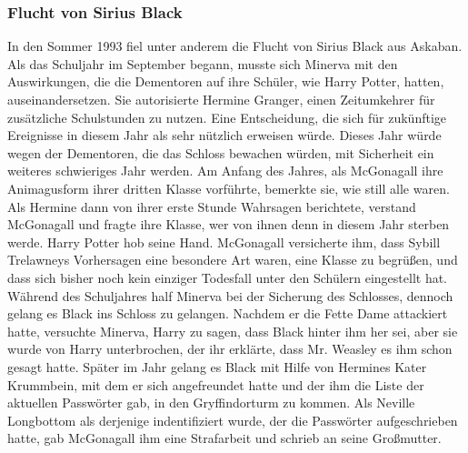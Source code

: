 \documentclass[a4paper, 10pt]{article}
\begin{document}
\subsubsection*{\large Flucht von Sirius Black}
In den Sommer 1993 fiel unter anderem die Flucht von Sirius Black aus Askaban. Als das Schuljahr im September begann, musste sich Minerva mit den Auswirkungen, die die Dementoren auf ihre Schüler, wie Harry Potter, hatten, auseinandersetzen. Sie autorisierte Hermine Granger, einen Zeitumkehrer für zusätzliche Schulstunden zu nutzen. Eine Entscheidung, die sich für zukünftige Ereignisse in diesem Jahr als sehr nützlich erweisen würde. Dieses Jahr würde wegen der Dementoren, die das Schloss bewachen würden, mit Sicherheit ein weiteres schwieriges Jahr werden.
\vspace{10pt}
\newline
{}  
Am Anfang des Jahres, als McGonagall ihre Animagusform ihrer dritten Klasse vorführte, bemerkte sie, wie still alle waren. Als Hermine dann von ihrer erste Stunde Wahrsagen berichtete, verstand McGonagall und fragte ihre Klasse, wer von ihnen denn in diesem Jahr sterben werde. Harry Potter hob seine Hand. McGonagall versicherte ihm, dass Sybill Trelawneys Vorhersagen eine besondere Art waren, eine Klasse zu begrüßen, und dass sich bisher noch kein einziger Todesfall unter den Schülern eingestellt hat.
\vspace{10pt}
\newline
{}  
Während des Schuljahres half Minerva bei der Sicherung des Schlosses, dennoch gelang es Black ins Schloss zu gelangen. Nachdem er die Fette Dame attackiert hatte, versuchte Minerva, Harry zu sagen, dass Black hinter ihm her sei, aber sie wurde von Harry unterbrochen, der ihr erklärte, dass Mr. Weasley es ihm schon gesagt hatte. Später im Jahr gelang es Black mit Hilfe von Hermines Kater Krummbein, mit dem er sich angefreundet hatte und der ihm die Liste der aktuellen Passwörter gab, in den Gryffindorturm zu kommen. Als Neville Longbottom als derjenige indentifiziert wurde, der die Passwörter aufgeschrieben hatte, gab McGonagall ihm eine Strafarbeit und schrieb an seine Großmutter.
\vspace{10pt}
\newline
{}  
\end{document}
